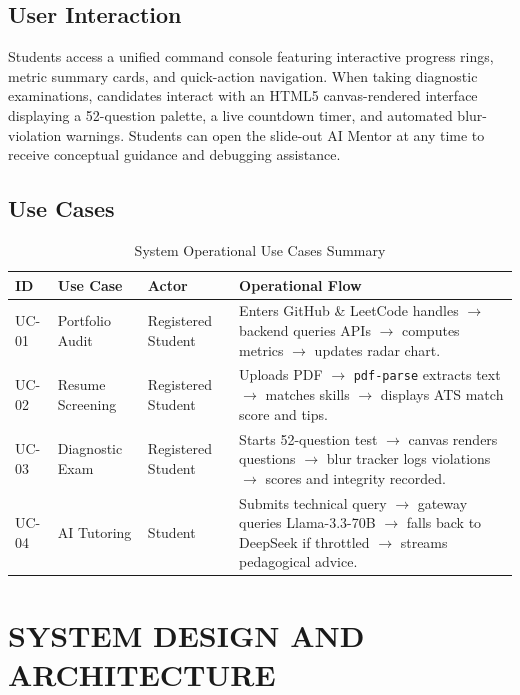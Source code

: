 \documentclass[12pt,a4paper]{report}
\begin{document}
\section{User Interaction}
Students access a unified command console featuring interactive progress rings, metric summary cards, and quick-action navigation. When taking diagnostic examinations, candidates interact with an HTML5 canvas-rendered interface displaying a 52-question palette, a live countdown timer, and automated blur-violation warnings. Students can open the slide-out AI Mentor at any time to receive conceptual guidance and debugging assistance.

\section{Use Cases}
\begin{table}[htbp]
\centering
\scriptsize
\caption{System Operational Use Cases Summary}
\label{tab:use_cases}
\begin{tabularx}{\textwidth}{l p{2.2cm} p{2.5cm} X}
\toprule
\textbf{ID} & \textbf{Use Case} & \textbf{Actor} & \textbf{Operational Flow} \\
\midrule
UC-01 & Portfolio Audit & Registered Student & Enters GitHub \& LeetCode handles $\rightarrow$ backend queries APIs $\rightarrow$ computes metrics $\rightarrow$ updates radar chart. \\
\addlinespace
UC-02 & Resume Screening & Registered Student & Uploads PDF $\rightarrow$ \texttt{pdf-parse} extracts text $\rightarrow$ matches skills $\rightarrow$ displays ATS match score and tips. \\
\addlinespace
UC-03 & Diagnostic Exam & Registered Student & Starts 52-question test $\rightarrow$ canvas renders questions $\rightarrow$ blur tracker logs violations $\rightarrow$ scores and integrity recorded. \\
\addlinespace
UC-04 & AI Tutoring & Student & Submits technical query $\rightarrow$ gateway queries Llama-3.3-70B $\rightarrow$ falls back to DeepSeek if throttled $\rightarrow$ streams pedagogical advice. \\
\bottomrule
\end{tabularx}
\end{table}


\chapter{SYSTEM DESIGN AND ARCHITECTURE}
\end{document}
